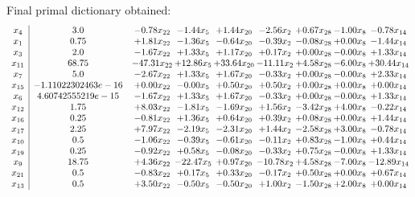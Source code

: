 \documentclass[8pt]{article}
\begin{document}
 Final primal dictionary obtained: 
\[\begin{array}{c| c c@{\hskip 2pt} c@{\hskip 2pt} c@{\hskip 2pt} c@{\hskip 2pt} c@{\hskip 2pt} c@{\hskip 2pt} c@{\hskip 2pt} }
 x_{4}   &  3.0 & -0.78 x_{22} & -1.44 x_{5} & +  1.44 x_{20} & -2.56 x_{2} & +  0.67 x_{28} & -1.00 x_{8} & -0.78 x_{14}\\
 x_{1}   &  0.75 & +  1.81 x_{22} & -1.36 x_{5} & -0.64 x_{20} & -0.39 x_{2} & -0.08 x_{28} & +  0.00 x_{8} & -1.44 x_{14}\\
 x_{3}   &  2.0 & -1.67 x_{22} & +  1.33 x_{5} & +  1.17 x_{20} & +  0.17 x_{2} & +  0.00 x_{28} & -0.00 x_{8} & +  1.33 x_{14}\\
 x_{11}   &  68.75 & -47.31 x_{22} & + 12.86 x_{5} & + 33.64 x_{20} & -11.11 x_{2} & +  4.58 x_{28} & -6.00 x_{8} & + 30.44 x_{14}\\
 x_{7}   &  5.0 & -2.67 x_{22} & +  1.33 x_{5} & +  1.67 x_{20} & -0.33 x_{2} & +  0.00 x_{28} & -0.00 x_{8} & +  2.33 x_{14}\\
 x_{15}   &  -1.11022302463e-16 & +  0.00 x_{22} & -0.00 x_{5} & +  0.50 x_{20} & +  0.50 x_{2} & +  0.00 x_{28} & +  0.00 x_{8} & +  0.00 x_{14}\\
 x_{6}   &  4.60742555219e-15 & -1.67 x_{22} & +  1.33 x_{5} & +  1.67 x_{20} & -0.33 x_{2} & +  0.00 x_{28} & -0.00 x_{8} & +  1.33 x_{14}\\
 x_{12}   &  1.75 & +  8.03 x_{22} & -1.81 x_{5} & -1.69 x_{20} & +  1.56 x_{2} & -3.42 x_{28} & +  4.00 x_{8} & -0.22 x_{14}\\
 x_{16}   &  0.25 & -0.81 x_{22} & +  1.36 x_{5} & +  0.64 x_{20} & +  0.39 x_{2} & +  0.08 x_{28} & +  0.00 x_{8} & +  1.44 x_{14}\\
 x_{17}   &  2.25 & +  7.97 x_{22} & -2.19 x_{5} & -2.31 x_{20} & +  1.44 x_{2} & -2.58 x_{28} & +  3.00 x_{8} & -0.78 x_{14}\\
 x_{10}   &  0.5 & -1.06 x_{22} & -0.39 x_{5} & -0.61 x_{20} & -0.11 x_{2} & +  0.83 x_{28} & -1.00 x_{8} & +  0.44 x_{14}\\
 x_{19}   &  0.25 & -0.92 x_{22} & +  0.58 x_{5} & -0.08 x_{20} & -0.33 x_{2} & +  0.75 x_{28} & -0.00 x_{8} & +  1.33 x_{14}\\
 x_{9}   &  18.75 & +  4.36 x_{22} & -22.47 x_{5} & +  0.97 x_{20} & -10.78 x_{2} & +  4.58 x_{28} & -7.00 x_{8} & -12.89 x_{14}\\
 x_{21}   &  0.5 & -0.83 x_{22} & +  0.17 x_{5} & +  0.33 x_{20} & -0.17 x_{2} & +  0.50 x_{28} & +  0.00 x_{8} & +  0.67 x_{14}\\
 x_{13}   &  0.5 & +  3.50 x_{22} & -0.50 x_{5} & -0.50 x_{20} & +  1.00 x_{2} & -1.50 x_{28} & +  2.00 x_{8} & +  0.00 x_{14}\\

\end{array}\]
\end{document}
